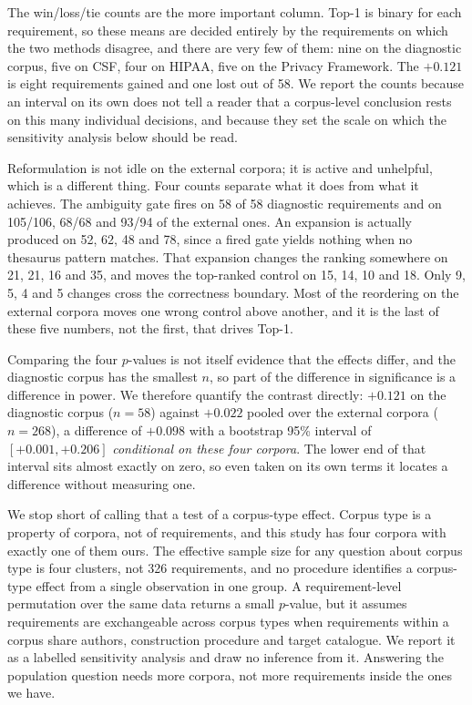 \documentclass[smallextended,natbib]{svjour3}
\begin{document}
The win/loss/tie counts are the more important column. Top-1 is binary for each requirement, so these means are decided entirely by the requirements on which the two methods disagree, and there are very few of them: nine on the diagnostic corpus, five on CSF, four on HIPAA, five on the Privacy Framework. The $+0.121$ is eight requirements gained and one lost out of 58. We report the counts because an interval on its own does not tell a reader that a corpus-level conclusion rests on this many individual decisions, and because they set the scale on which the sensitivity analysis below should be read.

Reformulation is not idle on the external corpora; it is active and unhelpful, which is a different thing. Four counts separate what it does from what it achieves. The ambiguity gate fires on 58 of 58 diagnostic requirements and on 105/106, 68/68 and 93/94 of the external ones. An expansion is actually produced on 52, 62, 48 and 78, since a fired gate yields nothing when no thesaurus pattern matches. That expansion changes the ranking somewhere on 21, 21, 16 and 35, and moves the top-ranked control on 15, 14, 10 and 18. Only 9, 5, 4 and 5 changes cross the correctness boundary. Most of the reordering on the external corpora moves one wrong control above another, and it is the last of these five numbers, not the first, that drives Top-1.

Comparing the four $p$-values is not itself evidence that the effects differ, and the diagnostic corpus has the smallest $n$, so part of the difference in significance is a difference in power. We therefore quantify the contrast directly: $+0.121$ on the diagnostic corpus ($n = 58$) against $+0.022$ pooled over the external corpora ($n = 268$), a difference of $+0.098$ with a bootstrap 95\% interval of $[+0.001, +0.206]$ \emph{conditional on these four corpora}. The lower end of that interval sits almost exactly on zero, so even taken on its own terms it locates a difference without measuring one.

We stop short of calling that a test of a corpus-type effect. Corpus type is a property of corpora, not of requirements, and this study has four corpora with exactly one of them ours. The effective sample size for any question about corpus type is four clusters, not 326 requirements, and no procedure identifies a corpus-type effect from a single observation in one group. A requirement-level permutation over the same data returns a small $p$-value, but it assumes requirements are exchangeable across corpus types when requirements within a corpus share authors, construction procedure and target catalogue. We report it as a labelled sensitivity analysis and draw no inference from it. Answering the population question needs more corpora, not more requirements inside the ones we have.
\end{document}
